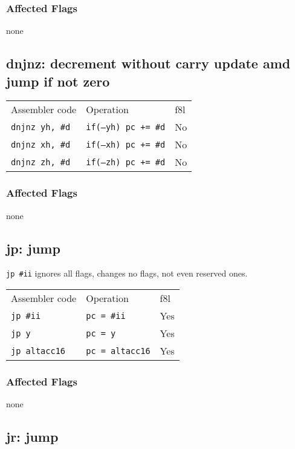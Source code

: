 \documentclass{book}
\begin{document}
\subsubsection*{Affected Flags}

none


\subsection{dnjnz: decrement without carry update amd jump if not zero}

\begin{tabular}{l l l}
Assembler code         & Operation          & f8l \\
\texttt{dnjnz yh, \#d} & \texttt{if(--yh) pc += \#d} & No \\
\texttt{dnjnz xh, \#d} & \texttt{if(--xh) pc += \#d} & No \\
\texttt{dnjnz zh, \#d} & \texttt{if(--zh) pc += \#d} & No \\
\end{tabular}

\subsubsection*{Affected Flags}

none


\subsection{jp: jump}

\texttt{jp \#ii} ignores all flags, changes no flags, not even reserved ones.

\begin{tabular}{l l l}
Assembler code       & Operation              & f8l \\
\texttt{jp \#ii}     & \texttt{pc = \#ii}     & Yes \\
\texttt{jp y}        & \texttt{pc = y}        & Yes \\
\texttt{jp altacc16} & \texttt{pc = altacc16} & Yes \\
\end{tabular}

\subsubsection*{Affected Flags}

none

\subsection{jr: jump}
\end{document}
